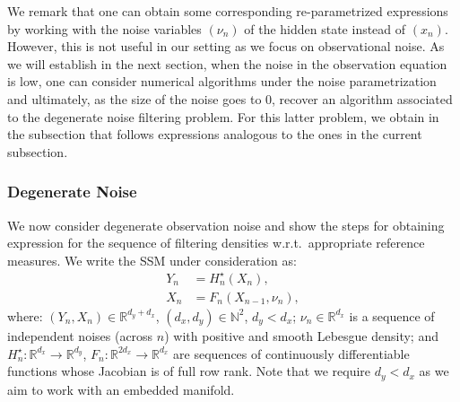 \documentclass[english,13pt]{article}
\numberwithin{equation}{section}
\begin{document}
We remark that one can obtain some corresponding re-parametrized expressions by working  with the noise variables $(\nu_n)$ of the hidden state instead of $(x_n)$. However, this is not useful in our setting  as we focus on observational noise.  As we will establish in the next section, when the noise in the observation equation is low,  one can consider numerical algorithms under the noise parametrization and ultimately,  as the size of the noise goes to $0$,  recover an algorithm associated to the degenerate noise filtering problem.  For this latter problem, we obtain in the subsection that follows expressions analogous to the ones in the current subsection. 




\subsubsection{Degenerate Noise}

We now consider degenerate observation noise and show the steps for obtaining expression for the sequence of filtering densities w.r.t.~appropriate reference measures.  We write the SSM under consideration as:
%
\begin{align*}
Y_n & = H_n^{\star}(X_n), \\
X_n & =  F_n(X_{n-1},\nu_n),
\end{align*}
%
where: $(Y_n,X_n)\in\mathbb{R}^{d_y+d_x}$, $(d_x,d_y)\in\mathbb{N}^2$, $d_y<d_x$;  $\nu_n\in\mathbb{R}^{d_x}$ is a sequence of independent noises (across $n$) with positive and smooth Lebesgue density; and $H_n^{\star}:\mathbb{R}^{d_x}\rightarrow\mathbb{R}^{d_y}$, $F_n:\mathbb{R}^{2d_x}\rightarrow\mathbb{R}^{d_x}$ are sequences of  continuously differentiable functions whose Jacobian is of full row rank.  Note that we require $d_y<d_x$ as we aim to work with an embedded manifold.
\end{document}
